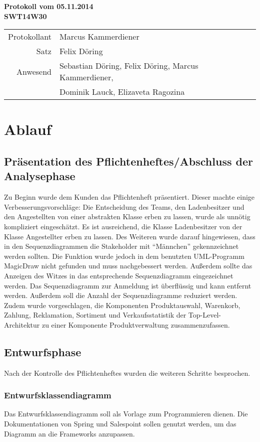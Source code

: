 \documentclass{scrartcl}
\begin{document}
\begin{center}
\LARGE \bf{Protokoll vom 05.11.2014 \\
SWT14W30}
\end{center}

\begin{tabular}{rp{10cm}}
Protokollant & Marcus Kammerdiener \\
Satz & Felix Döring \\
Anwesend & Sebastian Döring, Felix Döring, Marcus Kammerdiener,\\
& Dominik Lauck, Elizaveta Ragozina \\
\end{tabular}

\vspace*{3em}

\section{Ablauf}
\subsection{Pr\"asentation des Pflichtenheftes/Abschluss der Analysephase}
Zu Beginn wurde dem Kunden das Pflichtenheft präsentiert. Dieser machte einige Verbesserungsvorschläge: Die Entscheidung des Teams, den Ladenbesitzer und den Angestellten von einer abstrakten Klasse erben zu lassen, wurde als unn\"otig kompliziert eingeschätzt. Es ist ausreichend, die Klasse Ladenbesitzer von der Klasse Angestellter erben zu lassen. Des Weiteren wurde darauf hingewiesen, dass in den Sequenzdiagrammen die Stakeholder mit "`M\"annchen"' gekennzeichnet werden sollten. Die Funktion wurde jedoch in dem benutzten UML-Programm MagicDraw nicht gefunden und muss nachgebessert werden. Außerdem sollte das Anzeigen des Witzes in das entsprechende Sequenzdiagramm eingezeichnet werden. Das Sequenzdiagramm zur Anmeldung ist \"uberflüssig und kann entfernt werden. Außerdem soll die Anzahl der Sequenzdiagramme reduziert werden.\\
Zudem wurde vorgeschlagen, die Komponenten Produktauswahl, Warenkorb, Zahlung, Reklamation, Sortiment und Verkaufsstatistik der Top-Level-Architektur zu einer Komponente Produktverwaltung zusammenzufassen.
\subsection{Entwurfsphase}
Nach der Kontrolle des Pflichtenheftes wurden die weiteren Schritte besprochen.
\subsubsection{Entwurfsklassendiagramm}
Das Entwurfsklassendiagramm soll als Vorlage zum Programmieren dienen. Die Dokumentationen von Spring und Salespoint sollen genutzt werden, um das Diagramm an die Frameworks anzupassen.
\end{document}
